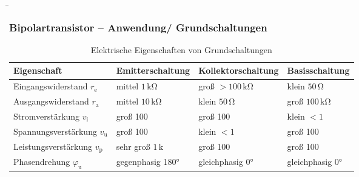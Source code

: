 \begin{frame}
    \b{
        \frametitle{Bipolartransistor -- Anwendung/ Grundschaltungen}
        \begin{table}[H]
    \centering
    \begin{tabular}{ |p{4.1cm}|p{2.35cm}|p{2.35cm}|p{2.35cm}| }
        \hline
            \textbf{Eigenschaft} & 
            \textbf{Emitter\-schaltung} & 
            \textbf{Kollektor\-schaltung} & 
            \textbf{Basis\-schaltung} \\
        \hline
            Eingangs\-widerstand $r_\mathrm{e}$ & 
            mittel $1\,\mathrm{k \Omega}$ & 
            groß $>100\,\mathrm{k \Omega}$ &
            klein $50\,\mathrm{\Omega}$ \\
        \hline
            Ausgangs\-widerstand $r_\mathrm{a}$ & 
            mittel $10\,\mathrm{k \Omega}$ & 
            klein $50\,\mathrm{\Omega}$ &
            groß $100\,\mathrm{k \Omega}$ \\
        \hline
            Strom\-verstärkung $v_\mathrm{i}$ & 
            groß 100 & 
            groß 100 &
            klein $<1$ \\
        \hline
            Spannungs\-verstärkung $v_\mathrm{u}$ & 
            groß 100 &  
            klein $<1$ &
            groß 100 \\
        \hline
            Leistungs\-verstärkung $v_\mathrm{p}$ & 
            sehr groß $1\,\mathrm{k}$ &  
            groß 100 & 
            groß 100 \\
        \hline
            Phasen\-drehung $\varphi_\mathrm{u}$ & 
            gegenphasig 180° & 
            gleichphasig 0° & 
            gleichphasig 0° \\
        \hline
    \end{tabular}
        \caption{Elektrische Eigenschaften von Grundschaltungen}
    \end{table}
    }
\end{frame}


